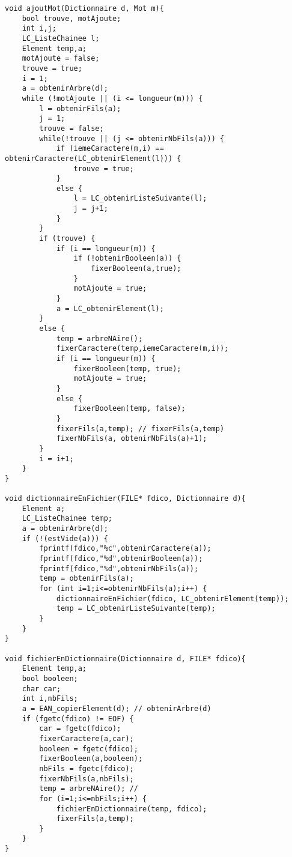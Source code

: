 \documentclass{report}
\begin{document}
\begin{lstlisting}
void ajoutMot(Dictionnaire d, Mot m){
    bool trouve, motAjoute;
    int i,j;
    LC_ListeChainee l;
    Element temp,a;
    motAjoute = false;
    trouve = true;
    i = 1;
    a = obtenirArbre(d);
    while (!motAjoute || (i <= longueur(m))) {
        l = obtenirFils(a);
        j = 1;
        trouve = false;
        while(!trouve || (j <= obtenirNbFils(a))) {
            if (iemeCaractere(m,i) == obtenirCaractere(LC_obtenirElement(l))) {
                trouve = true;
            }
            else {
                l = LC_obtenirListeSuivante(l);
                j = j+1;
            }
        }
        if (trouve) {
            if (i == longueur(m)) {
                if (!obtenirBooleen(a)) {
                    fixerBooleen(a,true);
                }
                motAjoute = true;
            }
            a = LC_obtenirElement(l);
        }
        else {
            temp = arbreNAire();
            fixerCaractere(temp,iemeCaractere(m,i));
            if (i == longueur(m)) {
                fixerBooleen(temp, true);
                motAjoute = true;
            }
            else {
                fixerBooleen(temp, false);
            }
            fixerFils(a,temp); // fixerFils(a,temp)
            fixerNbFils(a, obtenirNbFils(a)+1);
        }
        i = i+1;
    }
}
 
void dictionnaireEnFichier(FILE* fdico, Dictionnaire d){
    Element a;
    LC_ListeChainee temp;
    a = obtenirArbre(d);
    if (!(estVide(a))) {
        fprintf(fdico,"%c",obtenirCaractere(a));
		fprintf(fdico,"%d",obtenirBooleen(a));
		fprintf(fdico,"%d",obtenirNbFils(a));
		temp = obtenirFils(a);
        for (int i=1;i<=obtenirNbFils(a);i++) {
            dictionnaireEnFichier(fdico, LC_obtenirElement(temp));
			temp = LC_obtenirListeSuivante(temp);
        }
    }
}

void fichierEnDictionnaire(Dictionnaire d, FILE* fdico){
    Element temp,a;
    bool booleen;
    char car;
    int i,nbFils;
    a = EAN_copierElement(d); // obtenirArbre(d)
    if (fgetc(fdico) != EOF) {
        car = fgetc(fdico);
		fixerCaractere(a,car);
		booleen = fgetc(fdico);
		fixerBooleen(a,booleen);
		nbFils = fgetc(fdico);
		fixerNbFils(a,nbFils);
		temp = arbreNAire(); // 
        for (i=1;i<=nbFils;i++) {
            fichierEnDictionnaire(temp, fdico);
			fixerFils(a,temp);
        }
    }
}

\end{lstlisting}
 
\end{document}
